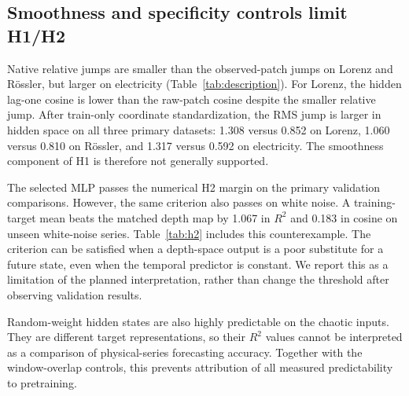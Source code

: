 \documentclass[10pt,a4paper,twocolumn]{article}
\begin{document}
\subsection{Smoothness and specificity controls limit H1/H2}
Native relative jumps are smaller than the observed-patch jumps on Lorenz and R\"ossler, but larger on electricity (Table~\ref{tab:description}).
For Lorenz, the hidden lag-one cosine is lower than the raw-patch cosine despite the smaller relative jump.
After train-only coordinate standardization, the RMS jump is larger in hidden space on all three primary datasets: 1.308 versus 0.852 on Lorenz, 1.060 versus 0.810 on R\"ossler, and 1.317 versus 0.592 on electricity.
The smoothness component of H1 is therefore not generally supported.

\begin{table}[t]
\centering\small
\setlength{\tabcolsep}{4pt}

\caption{Native-coordinate statistics on unseen validation series. For $v=h$ (hidden state) or $v=x$ (observed 16-sample patch), Jump is the mean of $\|v_{t+1}-v_t\|_2/\|v_t\|_2$ and Cos. is the mean lag-one cosine. Ratios depend on the representation's origin and norm.}
\label{tab:description}
\end{table}

The selected MLP passes the numerical H2 margin on the primary validation comparisons.
However, the same criterion also passes on white noise.
A training-target mean beats the matched depth map by 1.067 in $R^2$ and 0.183 in cosine on unseen white-noise series.
Table~\ref{tab:h2} includes this counterexample.
The criterion can be satisfied when a depth-space output is a poor substitute for a future state, even when the temporal predictor is constant.
We report this as a limitation of the planned interpretation, rather than change the threshold after observing validation results.

Random-weight hidden states are also highly predictable on the chaotic inputs.
They are different target representations, so their $R^2$ values cannot be interpreted as a comparison of physical-series forecasting accuracy.
Together with the window-overlap controls, this prevents attribution of all measured predictability to pretraining.

\begin{table}[t]
\centering\small
\setlength{\tabcolsep}{4pt}

\caption{MLP temporal-minus-depth validation gains at $k=1$: $\Delta$ is the temporal score minus the depth score. The final column applies the same margin and bootstrap rule to a constant training-mean temporal predictor.}
\label{tab:h2}
\end{table}
\end{document}
